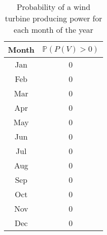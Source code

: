 \documentclass[a4paper]{article}
\begin{document}
\begin{table}
    \centering
    \caption{Probability of a wind turbine producing power for each month of the year}
    \label{powerprob}
    \begin{tabular}{|c|| c ||}
        \hline
        Month & $\mathbb{P}(P(V) > 0)$\\
        \hline\hline
        Jan & 0 \\
        \hline
        Feb & 0 \\
        \hline
        Mar & 0 \\
        \hline
        Apr & 0 \\
        \hline
        May & 0 \\
        \hline
        Jun & 0 \\
        \hline
        Jul & 0 \\
        \hline
        Aug & 0 \\
        \hline
        Sep & 0 \\
        \hline
        Oct & 0 \\
        \hline
        Nov & 0 \\
        \hline
        Dec & 0 \\
        \hline

    \end{tabular}
\end{table}
\end{document}
